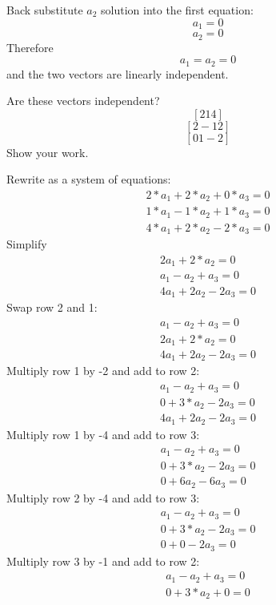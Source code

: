 Back substitute $a_2$ solution into the first equation:
$$a_1  = 0$$
$$a_2 = 0$$ 
Therefore $$a_1 = a_2 = 0$$ and the two vectors are linearly independent.

\begin{Exercise}[title={Vector Independence}, label=vector_independence]
    Are these vectors independent? 
$$[2 1 4]$$
$$[2 -1 2]$$ 
$$[0 1 -2]$$
Show your work.
\end{Exercise}
\begin{Answer}[ref=vector_independence]
    Rewrite as a system of equations:
        $$\begin{matrix}
			2*a_1 +2*a_2 + 0*a_3 = 0 \\
			1*a_1 - 1*a_2 + 1*a_3 = 0 \\
			4*a_1 + 2*a_2 - 2*a_3 = 0
		  \end{matrix} $$
	Simplify
		$$\begin{matrix}
			2a_1 +2*a_2 = 0 \\
			a_1 - a_2 + a_3 = 0 \\
			4a_1 + 2a_2 - 2a_3 = 0
		  \end{matrix} $$
	Swap row 2 and 1:
		$$\begin{matrix}
			a_1 - a_2 + a_3 = 0 \\
			2a_1 + 2*a_2 = 0 \\
			4a_1 + 2a_2 - 2a_3 = 0
		  \end{matrix} $$
	Multiply row 1 by -2 and add to row 2:
	   $$\begin{matrix}
			a_1 - a_2 + a_3 = 0 \\
			0 +  3*a_2 - 2a_3  = 0 \\
			4a_1 + 2a_2 - 2a_3 = 0
		  \end{matrix} $$
	Multiply row 1 by -4 and add to row 3:	
	    $$\begin{matrix}
			a_1 - a_2 + a_3 = 0 \\
			0 + 3*a_2 -2a_3 = 0 \\
			0 + 6a_2 - 6a_3 = 0
		  \end{matrix} $$
	Multiply row 2 by -4 and add to row 3:
	   $$\begin{matrix}
			a_1 - a_2 + a_3 = 0 \\
			0 + 3*a_2 -2a_3 = 0 \\
			0 + 0 - 2a_3 = 0
		  \end{matrix} $$
	Multiply row 3 by -1 and add to row 2:
		$$\begin{matrix}
			a_1 - a_2 + a_3 = 0 \\
			0 + 3*a_2 + 0 = 0 \\

\end{matrix}$$
\end{Answer}
